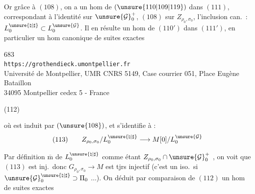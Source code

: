 Or grâce à $(108)$, on a un hom de $(\unsure{110|109|119})$ dans $(111)$,
correspondant à l'identité sur $\unsure{\mathcal G}_0^+$,
$(108)$ sur $Z_{\rho_0,\sigma_0}$, l'inclusion can.\ :
$L_0^{\unsure{\natural|\sharp}}\subset L_0^{\unsure{\mathcal G}}$.
Il en résulte un hom de $(110')$ dans $(111')$, en particulier un hom
canonique de suites exactes


\begin{center}
683\\
\texttt{https://grothendieck.umontpellier.fr}\\
Université de Montpellier, UMR CNRS 5149, Case courrier 051, Place Eugène Bataillon\\
34095 Montpellier cedex 5 - France
\end{center}



\begin{samepage}
(112)\quad
{}
\end{samepage}

où
est  induit par
$(\unsure{108})$, et s'identifie à :
\[
(113)\qquad Z_{\rho_0,\sigma_0}/L_0^{\unsure{\natural|\sharp}}
\longrightarrow M[0]/L_0^{\unsure{\mathcal G}}
\]

Par définition $\overline{\mathrm m}$ de
$L_0^{\unsure{\natural|\sharp}}$ comme étant
$Z_{\rho_0,\sigma_0}\cap\unsure{\mathcal G}_0^+$
, on voit que $(113)$ est inj.\ donc
$G_{\rho_0,\sigma_0}\longrightarrow M$ est tjrs injectif
(c'est un iso.\ si
$\unsure{\mathcal G}_0^{\unsure{\natural|\sharp}}\supset\Pi_0$
$\ldots$).
On déduit par comparaison de $(112)$ un hom de suites exactes


